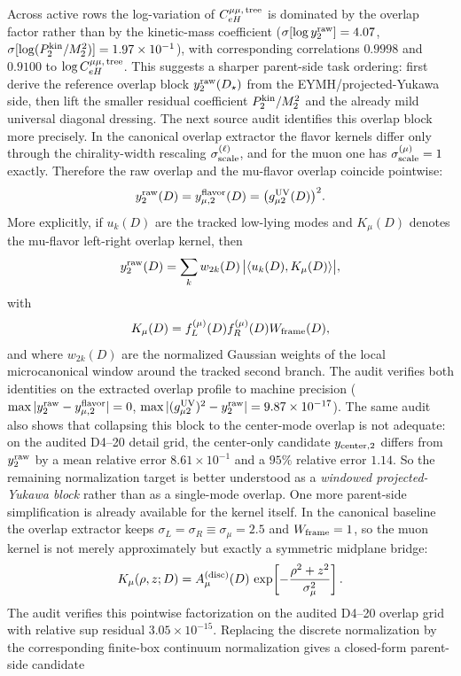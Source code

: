 \documentclass[aps,prd,onecolumn,notitlepage,nofootinbib,superscriptaddress,11pt,floatfix]{revtex4-2}
\begin{document}
Across active rows the log-variation of $C_{eH}^{\mu\mu,\,\rm tree}$ is dominated by the overlap factor rather than by the kinetic-mass coefficient ($\sigma[\log y_2^{\rm raw}]=4.07$, $\sigma[\log(P_2^{\rm kin}/M_2^2)]=1.97\times10^{-1}$), with corresponding correlations $0.9998$ and $0.9100$ to $\log C_{eH}^{\mu\mu,\,\rm tree}$. This suggests a sharper parent-side task ordering: first derive the reference overlap block $y_2^{\rm raw}(D_\star)$ from the EYMH/projected-Yukawa side, then lift the smaller residual coefficient $P_2^{\rm kin}/M_2^2$ and the already mild universal diagonal dressing.
The next source audit identifies this overlap block more precisely. In the canonical overlap extractor the flavor kernels differ only through the chirality-width rescaling $\sigma_{\rm scale}^{(\ell)}$, and for the muon one has $\sigma_{\rm scale}^{(\mu)}=1$ exactly. Therefore the raw overlap and the mu-flavor overlap coincide pointwise:
\[
y_2^{\rm raw}(D)=y_{\mu,2}^{\rm flavor}(D)=\bigl(g_{\mu 2}^{\rm UV}(D)\bigr)^2.
\]
More explicitly, if $u_k(D)$ are the tracked low-lying modes and $K_\mu(D)$ denotes the mu-flavor left-right overlap kernel, then
\[
y_2^{\rm raw}(D)=\sum_k w_{2k}(D)\,\bigl|\langle u_k(D),K_\mu(D)\rangle\bigr|,
\]
with
\[
K_\mu(D)=f_L^{(\mu)}(D)f_R^{(\mu)}(D)W_{\rm frame}(D),
\]
and where $w_{2k}(D)$ are the normalized Gaussian weights of the local microcanonical window around the tracked second branch. The audit  verifies both identities on the extracted overlap profile to machine precision ($\max|y_2^{\rm raw}-y_{\mu,2}^{\rm flavor}|=0$, $\max|(g_{\mu 2}^{\rm UV})^2-y_2^{\rm raw}|=9.87\times10^{-17}$). The same audit also shows that collapsing this block to the center-mode overlap is not adequate: on the audited D4--20 detail grid, the center-only candidate $y_{{\rm center},2}$ differs from $y_2^{\rm raw}$ by a mean relative error $8.61\times10^{-1}$ and a $95\%$ relative error $1.14$. So the remaining normalization target is better understood as a \emph{windowed projected-Yukawa block} rather than as a single-mode overlap.
One more parent-side simplification is already available for the kernel itself. In the canonical baseline the overlap extractor keeps $\sigma_L=\sigma_R\equiv \sigma_\mu=2.5$ and $W_{\rm frame}=1$, so the muon kernel is not merely approximately but exactly a symmetric midplane bridge:
\[
K_\mu(\rho,z;D)
=
A_\mu^{\rm(disc)}(D)\,
\exp\!\left[-\frac{\rho^2+z^2}{\sigma_\mu^2}\right].
\]
The audit  verifies this pointwise factorization on the audited D4--20 overlap grid with relative sup residual $3.05\times10^{-15}$. Replacing the discrete normalization by the corresponding finite-box continuum normalization gives a closed-form parent-side candidate
\end{document}
